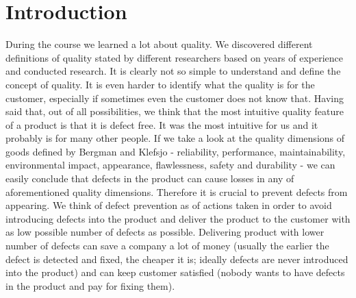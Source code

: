 \section{Introduction}
During the course we learned a lot about quality. We discovered different definitions of quality stated by different researchers based on years of experience and conducted research. It is clearly not so simple to understand and define the concept of quality. It is even harder to identify what the quality is for the customer, especially if sometimes even the customer does not know that. Having said that, out of all possibilities, we think that the most intuitive quality feature of a product is that it is defect free. It was the most intuitive for us and it probably is for many other people. If we take a look at the quality dimensions of goods defined by Bergman and Klefsjo\cite{bergman} - reliability, performance, maintainability, environmental impact, appearance, flawlessness, safety and durability - we can easily conclude that defects in the product can cause losses in any of aforementioned quality dimensions. Therefore it is crucial to prevent defects from appearing. We think of defect prevention as of actions taken in order to avoid introducing defects into the product and deliver the product to the customer with as low possible number of defects as possible. Delivering product with lower number of defects can save a company a lot of money (usually the earlier the defect is detected and fixed, the cheaper it is; ideally defects are never introduced into the product) and can keep customer satisfied (nobody wants to have defects in the product and pay for fixing them). 
